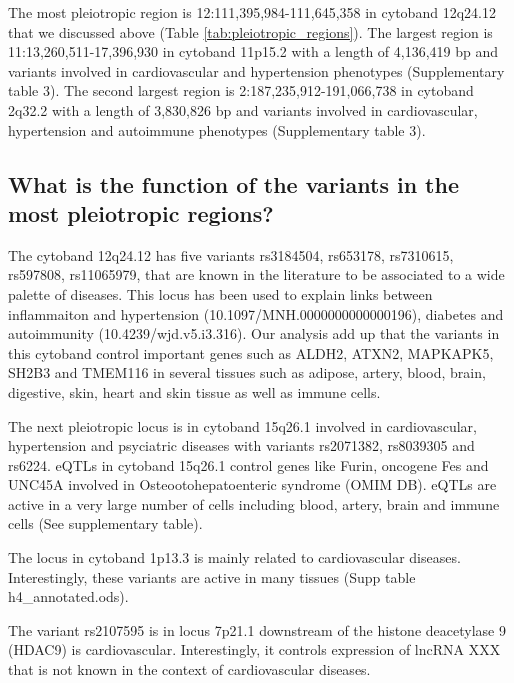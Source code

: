 The most pleiotropic region is 12:111,395,984-111,645,358 in cytoband 12q24.12 that we discussed above (Table \ref{tab:pleiotropic_regions}).
%
The largest region is 11:13,260,511-17,396,930 in cytoband 11p15.2 with a length of 4,136,419 bp and variants involved in cardiovascular and hypertension phenotypes (Supplementary table 3).
%
The second largest region is 2:187,235,912-191,066,738 in cytoband 2q32.2 with a length of 3,830,826 bp and variants involved in cardiovascular, hypertension and autoimmune phenotypes  (Supplementary table 3).

\subsection*{What is the function of the variants in the most pleiotropic regions?}


The cytoband 12q24.12 has five variants rs3184504, rs653178, rs7310615, rs597808, rs11065979, that are known in the literature to be associated to a wide palette of diseases.
This locus has been used to explain links between inflammaiton and hypertension (10.1097/MNH.0000000000000196), diabetes and autoimmunity (10.4239/wjd.v5.i3.316).
%
Our analysis add up that the variants in this cytoband control important genes such as ALDH2, ATXN2, MAPKAPK5, SH2B3 and TMEM116 in several tissues such as adipose, artery, blood, brain, digestive, skin, heart and skin tissue as well as immune cells.


The next pleiotropic locus is in cytoband 15q26.1 involved in cardiovascular, hypertension and psyciatric diseases with variants rs2071382, rs8039305 and rs6224.
%
eQTLs in cytoband 15q26.1 control genes like Furin, oncogene Fes and UNC45A involved in Osteootohepatoenteric syndrome (OMIM DB).
%
eQTLs are active in a very large number of cells including blood, artery, brain and immune cells (See supplementary table).

The locus in cytoband 1p13.3 is mainly related to cardiovascular diseases.
Interestingly, these variants are active in many tissues (Supp table h4_annotated.ods).



The variant rs2107595 is in locus 7p21.1 downstream of the histone deacetylase 9 (HDAC9) is cardiovascular. Interestingly, it controls expression of lncRNA XXX that is not known in the context of cardiovascular diseases.

